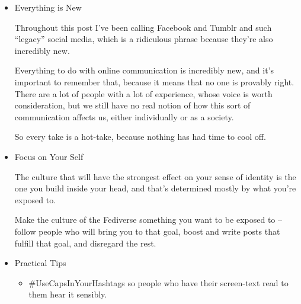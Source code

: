 \documentclass[11pt]{article}
\begin{document}
\begin{itemize}
\begin{itemize}
So talking about “Fediverse culture,” is always talking about the shapeless and shifting culture that the speaker is exposed to on the Fediverse, and while it’s a bit sloppy to use that shorthand, it’s not going to change.

If people are talking about Fediverse culture, and you see it, on the Fediverse, they’re talking (at least in part) about the culture you’re a part of, and you shouldn’t just brush that off.
\item Everything is New
\label{sec:org91035cf}

Throughout this post I’ve been calling Facebook and Tumblr and such “legacy” social media, which is a ridiculous phrase because they’re also incredibly new.

Everything to do with online communication is incredibly new, and it’s important to remember that, because it means that no one is provably right. There are a lot of people with a lot of experience, whose voice is worth consideration, but we still have no real notion of how this sort of communication affects us, either individually or as a society.

So every take is a hot-take, because nothing has had time to cool off.
\item Focus on Your Self
\label{sec:orgff700b7}

The culture that will have the strongest effect on your sense of identity is the one you build inside your head, and that’s determined mostly by what you’re exposed to.

Make the culture of the Fediverse something you want to be exposed to – follow people who will bring you to that goal, boost and write posts that fulfill that goal, and disregard the rest.
\item Practical Tips
\label{sec:org38b0903}
\begin{itemize}
\item \#UseCapsInYourHashtags so people who have their screen-text read to them hear it sensibly.
\end{itemize}
\end{itemize}
\end{itemize}
\stopcontents[level-4]
\end{document}
